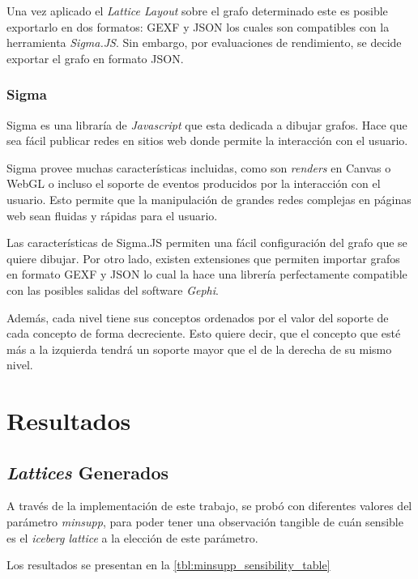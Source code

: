 \documentclass[12pt,oneside,letterpaper]{book}
\newcommand{\eng}[1]{\textit{#1}\xspace}			%
\newcommand{\abr}[1]{\textsc{#1}\xspace}           %
\theoremstyle{definition}
\begin{document}
Una vez aplicado el \eng{Lattice Layout} sobre el grafo determinado este es posible exportarlo en dos formatos: \abr{GEXF} y \abr{JSON} los cuales son compatibles con la herramienta \eng{Sigma.JS}. Sin embargo, por evaluaciones de rendimiento, se decide exportar el grafo en formato \abr{JSON}.

\subsection{Sigma}
\label{sub:exporter_to_sigma}
Sigma es una libraría de \eng{Javascript} que esta dedicada a dibujar grafos. Hace que sea fácil publicar redes en sitios web donde permite la interacción con el usuario.

Sigma provee muchas características incluidas, como son \eng{renders} en Canvas o WebGL o incluso el soporte de eventos producidos por la interacción con el usuario. Esto permite que la manipulación de grandes redes complejas en páginas web sean fluidas y rápidas para el usuario.

Las características de Sigma.JS permiten una fácil configuración del grafo que se quiere dibujar. Por otro lado, existen extensiones que permiten importar grafos en formato \abr{GEXF} y \abr{JSON} lo cual la hace una librería perfectamente compatible con las posibles salidas del software \eng{Gephi}.

Además, cada nivel tiene sus conceptos ordenados por el valor del soporte de cada concepto de forma decreciente. Esto quiere decir, que el concepto que esté más a la izquierda tendrá un soporte mayor que el de la derecha de su mismo nivel.


\chapter{Resultados}
\label{chap:results}
\section{\eng{Lattices} Generados}
A través de la implementación de este trabajo, se probó con diferentes valores del parámetro \eng{minsupp}, para poder tener una observación tangible de cuán sensible es el \eng{iceberg lattice} a la elección de este parámetro.

Los resultados se presentan en la \autoref{tbl:minsupp_sensibility_table}
\end{document}
